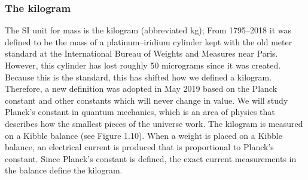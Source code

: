 \documentclass{report}
\begin{document}
    \subsubsection{The kilogram}
    \bigbreak \noindent 
    The SI unit for mass is the kilogram (abbreviated kg); From 1795–2018 it was defined to be the mass of a platinum–iridium cylinder kept with the old meter standard at the International Bureau of Weights and Measures near Paris. However, this cylinder has lost roughly 50 micrograms since it was created. Because this is the standard, this has shifted how we defined a kilogram. Therefore, a new definition was adopted in May 2019 based on the Planck constant and other constants which will never change in value. We will study Planck’s constant in quantum mechanics, which is an area of physics that describes how the smallest pieces of the universe work. The kilogram is measured on a Kibble balance (see Figure 1.10). When a weight is placed on a Kibble balance, an electrical current is produced that is proportional to Planck’s constant. Since Planck’s constant is defined, the exact current measurements in the balance define the kilogram.

    \pagebreak 
\end{document}
